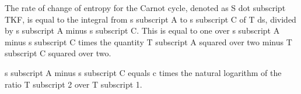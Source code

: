 The rate of change of entropy for the Carnot cycle, denoted as S dot subscript TKF, is equal to the integral from s subscript A to s subscript C of T ds, divided by s subscript A minus s subscript C. This is equal to one over s subscript A minus s subscript C times the quantity T subscript A squared over two minus T subscript C squared over two.

s subscript A minus s subscript C equals c times the natural logarithm of the ratio T subscript 2 over T subscript 1.